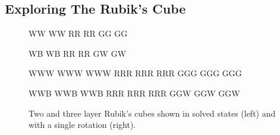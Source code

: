 \subsection{Exploring The Rubik's Cube}

\begin{figure}[h]
	\begin{center}
		\TwoFaceUp
		{W}{W}
		{W}{W}
		\TwoFaceRight
		{R}{R}
		{R}{R}
		\TwoFaceFront
		{G}{G}
		{G}{G}
		\begin{minipage}{0.15\linewidth}
		    \centering
		    \scalebox{3}{$\rightarrow$}
		\end{minipage}
		\TwoFaceUp
		{W}{B}
		{W}{B}
		\TwoFaceRight
		{R}{R}
		{R}{R}
		\TwoFaceFront
		{G}{W}
		{G}{W}
		
		\vspace{1em}
		
		\RubikFaceUp
		{W}{W}{W}
		{W}{W}{W}
		{W}{W}{W}
		\RubikFaceRight
		{R}{R}{R}
		{R}{R}{R}
		{R}{R}{R}
		\RubikFaceFront
		{G}{G}{G}
		{G}{G}{G}
		{G}{G}{G}
		\begin{minipage}{0.15\linewidth}
			\centering
			\scalebox{3}{$\rightarrow$}
		\end{minipage}
		\RubikFaceUp
		{W}{W}{B}
		{W}{W}{B}
		{W}{W}{B}
		\RubikFaceRight
		{R}{R}{R}
		{R}{R}{R}
		{R}{R}{R}
		\RubikFaceFront
		{G}{G}{W}
		{G}{G}{W}
		{G}{G}{W}
	
		\caption{Two and three layer Rubik’s cubes shown in solved states (left) and with a single rotation (right).}
		\label{fig:two-cube-and-rubik-cube-simple-turn}
	\end{center}
\end{figure}





